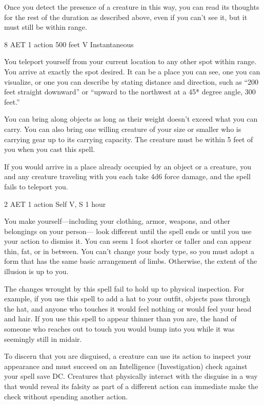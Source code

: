 Once you detect the presence of a creature in this way, you can read its thoughts for the rest of the duration as described above, even if you can't see it, but it must still be within range.


{8 AET}
{1 action}
{500 feet}
{V}
{Instantaneous}

You teleport yourself from your current location to any other spot within range. You arrive at exactly the spot desired. It can be a place you can see, one you can visualize, or one you can describe by stating distance and direction, such as “200 feet straight downward” or “upward to the northwest at a 45* degree angle, 300 feet.”

You can bring along objects as long as their weight doesn't exceed what you can carry. You can also bring one willing creature of your size or smaller who is carrying gear up to its carrying capacity. The creature must be within 5 feet of you when you cast this spell.

If you would arrive in a place already occupied by an object or a creature, you and any creature traveling with you each take 4d6 force damage, and the spell fails to teleport you.


{2 AET}
{1 action}
{Self}
{V, S}
{1 hour}

You make yourself—including your clothing, armor, weapons, and other belongings on your person— look different until the spell ends or until you use your action to dismiss it. You can seem 1 foot shorter or taller and can appear thin, fat, or in between. You can't change your body type, so you must adopt a form that has the same basic arrangement of limbs. Otherwise, the extent of the illusion is up to you.

The changes wrought by this spell fail to hold up to physical inspection. For example, if you use this spell to add a hat to your outfit, objects pass through the hat, and anyone who touches it would feel nothing or would feel your head and hair. If you use this spell to appear thinner than you are, the hand of someone who reaches out to touch you would bump into you while it was seemingly still in midair.

To discern that you are disguised, a creature can use its action to inspect your appearance and must succeed on an Intelligence (Investigation) check against your spell save DC. Creatures that physically interact with the disguise in a way that would reveal its falsity as part of a different action can immediate make the check without spending another action.


